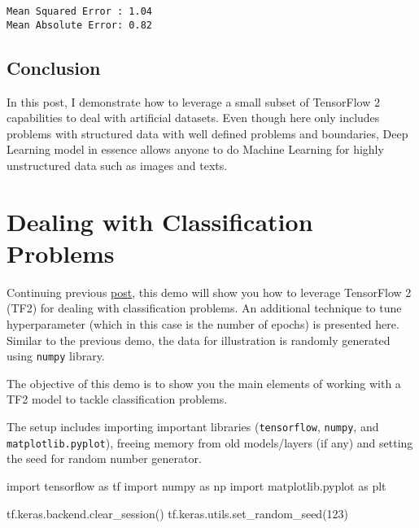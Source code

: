 \documentclass[
  letterpaper,
  DIV=11,
  numbers=noendperiod]{scrreprt}
\newenvironment{Shaded}{\begin{snugshade}}{\end{snugshade}}
\newcommand{\DecValTok}[1]{\textcolor[rgb]{0.68,0.00,0.00}{#1}}
\newcommand{\ImportTok}[1]{\textcolor[rgb]{0.00,0.46,0.62}{#1}}
\newcommand{\NormalTok}[1]{\textcolor[rgb]{0.00,0.23,0.31}{#1}}
\begin{document}
\begin{verbatim}
Mean Squared Error : 1.04
Mean Absolute Error: 0.82
\end{verbatim}

\hypertarget{conclusion}{%
\section{Conclusion}\label{conclusion}}

In this post, I demonstrate how to leverage a small subset of TensorFlow
2 capabilities to deal with artificial datasets. Even though here only
includes problems with structured data with well defined problems and
boundaries, Deep Learning model in essence allows anyone to do Machine
Learning for highly unstructured data such as images and texts.

\hypertarget{dealing-with-classification-problems}{%
\chapter{Dealing with Classification
Problems}\label{dealing-with-classification-problems}}

Continuing previous
\href{../post-06-tensorflow-regression-basics}{post}, this demo will
show you how to leverage TensorFlow 2 (TF2) for dealing with
classification problems. An additional technique to tune hyperparameter
(which in this case is the number of epochs) is presented here. Similar
to the previous demo, the data for illustration is randomly generated
using \texttt{numpy} library.

The objective of this demo is to show you the main elements of working
with a TF2 model to tackle classification problems.

The setup includes importing important libraries (\texttt{tensorflow},
\texttt{numpy}, and \texttt{matplotlib.pyplot}), freeing memory from old
models/layers (if any) and setting the seed for random number generator.

\begin{Shaded}
\begin{Highlighting}[]
\ImportTok{import}\NormalTok{ tensorflow }\ImportTok{as}\NormalTok{ tf}
\ImportTok{import}\NormalTok{ numpy }\ImportTok{as}\NormalTok{ np}
\ImportTok{import}\NormalTok{ matplotlib.pyplot }\ImportTok{as}\NormalTok{ plt}
\end{Highlighting}
\end{Shaded}

\begin{Shaded}
\begin{Highlighting}[]
\NormalTok{tf.keras.backend.clear\_session()}
\NormalTok{tf.keras.utils.set\_random\_seed(}\DecValTok{123}\NormalTok{)}
\end{Highlighting}
\end{Shaded}
\end{document}
